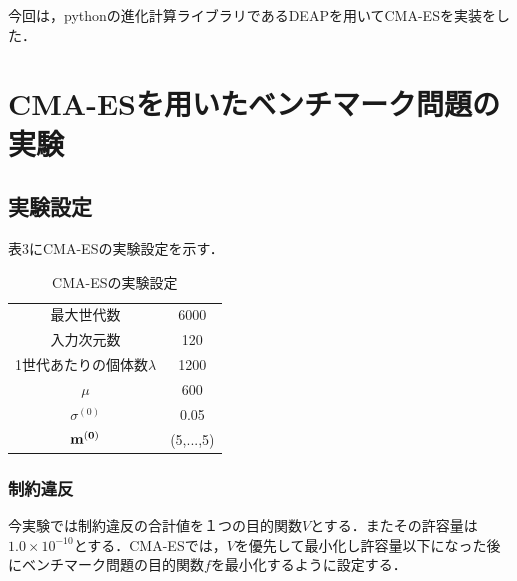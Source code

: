 \documentclass[twocolumn]{jarticle}
\begin{document}
今回は，pythonの進化計算ライブラリであるDEAP\cite{DEAP_JMLR2012}を用いてCMA-ESを実装をした．


\section{CMA-ESを用いたベンチマーク問題の実験}
	\subsection{実験設定}
		表3にCMA-ESの実験設定を示す．
		\begin{table}[htbp]
			\begin{center}
				\caption{CMA-ESの実験設定}
				\begin{tabular}{| c | c |} \hline
					最大世代数 & 6000 \\
					入力次元数 & 120 \\
					1世代あたりの個体数$\lambda$ & 1200 \\
					$\mu$ & 600 \\
					$\sigma^{(0)}$ & 0.05 \\ 
					$\bf{m}^{(0)}$ &  (5,...,5) \\ \hline
				\end{tabular}
			\end{center}
		\end{table}
	

	\subsubsection{制約違反}
	今実験では制約違反の合計値を１つの目的関数$V$とする．またその許容量は$1.0\times10^{-10}$とする．CMA-ESでは，$V$を優先して最小化し許容量以下になった後にベンチマーク問題の目的関数$f$を最小化するように設定する．
	
\end{document}
